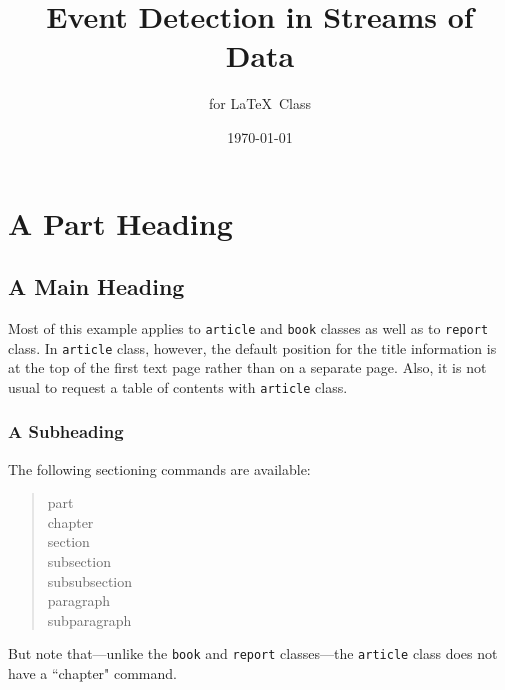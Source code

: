 \documentclass[12pt]{book}              %
\title{\bf Event Detection in Streams of Data}    %
\author{for \LaTeX\ Class}              %
\date{\today}                           %
\begin{document}
\frontmatter                            %
\maketitle                              %
\tableofcontents                        %
\mainmatter                             %
\part{A Part Heading}                   %
\chapter{A Main Heading}                %
Most of this example applies to \texttt{article} and \texttt{book} classes
as well as to \texttt{report} class. In \texttt{article} class, however,
the default position for the title information is at the top of
the first text page rather than on a separate page. Also, it is
not usual to request a table of contents with \texttt{article} class.
 
\section{A Subheading}                  %
The following sectioning commands are available:
\begin{quote}                           %
 part \\                                %
 chapter \\                             %
 section \\ 
 subsection \\ 
 subsubsection \\ 
 paragraph \\ 
 subparagraph 
\end{quote}                             %
But note that---unlike the \texttt{book} and \texttt{report} classes---the
\texttt{article} class does not have a ``chapter" command.
 
\end{document}
